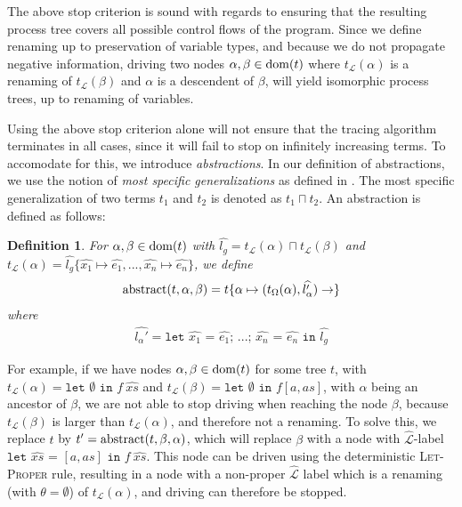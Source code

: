 \documentclass[10pt]{../sigplanconf}
\newcommand{\dom}{\ensuremath{{\rm dom}}}
\newtheorem{definition}{Definition}
\begin{document}
The above stop criterion is sound with regards to ensuring that the
resulting process tree covers all possible control flows of the
program. Since we define renaming up to preservation of variable
types, and because we do not propagate negative information, driving
two nodes $\alpha, \beta \in \dom(t)$ where $t_\mathcal{L}(\alpha)$ is
a renaming of $t_\mathcal{L}(\beta)$ and $\alpha$ is a descendent of
$\beta$, will yield isomorphic process trees, up to renaming of
variables.

Using the above stop criterion alone will not ensure that the tracing
algorithm terminates in all cases, since it will fail to stop on
infinitely increasing terms. To accomodate for this, we introduce
\emph{abstractions}. In our definition of abstractions, we use the
notion of \emph{most specific generalizations} as defined in
\cite{sorensen1998introduction}. The most specific generalization of
two terms $t_1$ and $t_2$ is denoted as $t_1 \sqcap t_2$. An
abstraction is defined as follows:
\begin{definition}
  For $\alpha, \beta \in \dom(t)$ with $\widehat{l_g} =
  t_\mathcal{L}(\alpha) \sqcap t_\mathcal{L}(\beta)$ and
  $t_\mathcal{L}(\alpha) = \widehat{l_g} \{ \widehat{x_1} \mapsto
  \widehat{e_1}, ..., \widehat{x_n} \mapsto \widehat{e_n} \}$, we
  define
\begin{align*}
{\rm abstract}(t,\alpha,\beta) = t \{ \alpha \mapsto (t_\Omega(\alpha), \widehat{l_\alpha'})\rightarrow \}
\end{align*}
where
\begin{align*}
\widehat{l_\alpha'} = \texttt{let $\widehat{x_1}$ = $\widehat{e_1}$; $...$; $\widehat{x_n}$ = $\widehat{e_n}$ in $\widehat{l_g}$}
\end{align*}
\end{definition}

For example, if we have nodes $\alpha,\beta \in \dom(t)$ for some tree
$t$, with $t_\mathcal{L}(\alpha) = \texttt{let $\emptyset$ in $f
  ~\widehat{xs}$}$ and $t_\mathcal{L}(\beta) = \texttt{let $\emptyset$ in $f [a, as]$}$, with $\alpha$ being an ancestor of $\beta$, we are
not able to stop driving when reaching the node $\beta$, because
$t_\mathcal{L}(\beta)$ is larger than $t_\mathcal{L}(\alpha)$, and
therefore not a renaming. To solve this, we replace $t$ by $t' = {\rm
  abstract}(t, \beta, \alpha)$, which will replace $\beta$ with a node
with $\widehat{\mathcal{L}}$-label $\texttt{let $\widehat{xs}$ = $[a,
  as]$ in $f~\widehat{xs}$}$. This node can be driven using the
deterministic \textsc{Let-Proper} rule, resulting in a node with a
non-proper $\widehat{\mathcal{L}}$ label which is a renaming (with
$\theta = \emptyset$) of $t_\mathcal{L}(\alpha)$, and driving can
therefore be stopped.
\end{document}
